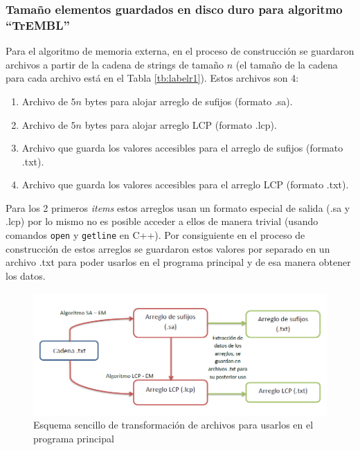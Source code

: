 \subsubsection{Tamaño elementos guardados en disco duro para algoritmo ``TrEMBL''}

Para el algoritmo de memoria externa, en el proceso de construcción se guardaron archivos a partir de la cadena de strings de tamaño $n$ (el tamaño de la cadena para cada archivo está en el Tabla \ref{tb:labelr1}). Estos archivos son 4:

\begin{enumerate}

\item Archivo de $5n$ bytes para alojar arreglo de sufijos (formato .sa).
\item Archivo de $5n$ bytes para alojar arreglo LCP (formato .lcp).
\item Archivo que guarda los valores accesibles para el arreglo de sufijos (formato .txt).
\item Archivo que guarda los valores accesibles para el arreglo LCP (formato .txt).

\end{enumerate}

Para los 2 primeros \textit{items} estos arreglos usan un formato especial de salida (.sa y .lcp) por lo mismo no es posible acceder a ellos de manera trivial (usando comandos \texttt{open} y \texttt{getline} en C++). Por consiguiente en el proceso de construcción de estos arreglos se guardaron estos valores por separado en un archivo .txt para poder usarlos en el programa principal y de esa manera obtener los datos.

\begin{figure}[h]
    \centering
    \includegraphics[width=1.0\textwidth]{./images/esquema_v1.PNG}
    \caption{Esquema sencillo de transformación de archivos para usarlos en el programa principal}
    \label{fig:imple1}
\end{figure}

